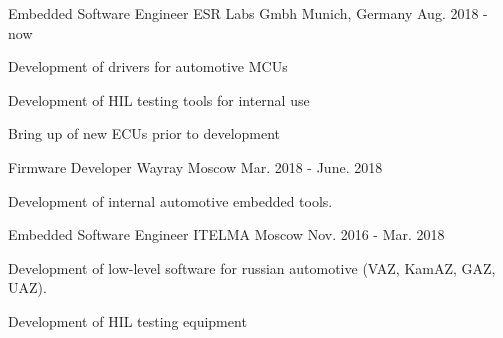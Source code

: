 


\begin{cventries}


\cventry
{Embedded Software Engineer} %
{ESR Labs Gmbh} %
{Munich, Germany} %
{Aug. 2018 - now} %
{ %
\begin{cvitems}
\item {Development of drivers for automotive MCUs}
\item {Development of HIL testing tools for internal use}
\item {Bring up of new ECUs prior to development}
\end{cvitems}
}


\cventry
{Firmware Developer} %
{Wayray} %
{Moscow} %
{Mar. 2018 - June. 2018} %
{ %
\begin{cvitems}
\item {Development of internal automotive embedded tools.}
\end{cvitems}
}


\cventry
{Embedded Software Engineer} %
{ITELMA} %
{Moscow} %
{Nov. 2016 - Mar. 2018} %
{ %
\begin{cvitems}
\item {Development of low-level software for russian automotive (VAZ, KamAZ, GAZ, UAZ).}
\item {Development of HIL testing equipment}
\end{cvitems}
}


\end{cventries}